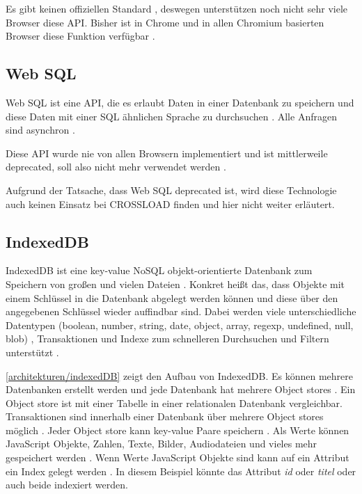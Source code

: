 Es gibt keinen offiziellen Standard \autocite{mdn-file-system} \autocite{caniuse-filesystem}, deswegen unterstützen noch nicht sehr viele Browser diese \ac{API}. Bisher ist in Chrome und in allen Chromium basierten Browser diese Funktion verfügbar \autocite{caniuse-filesystem}.

\subsection{Web SQL}
Web SQL ist eine \ac{API}, die es erlaubt Daten in einer Datenbank zu speichern und diese Daten mit einer SQL ähnlichen Sprache zu durchsuchen \autocite{w3-web-sql}. Alle Anfragen sind asynchron \autocite{Hajian2019}.

Diese \ac{API} wurde nie von allen Browsern implementiert und ist mittlerweile deprecated, soll also nicht mehr verwendet werden \autocite{Hajian2019}.

Aufgrund der Tatsache, dass Web SQL deprecated ist, wird diese Technologie auch keinen Einsatz bei CROSSLOAD finden und hier nicht weiter erläutert. 

\subsection{IndexedDB}
IndexedDB ist eine key-value NoSQL objekt-orientierte Datenbank zum Speichern von großen und vielen Dateien \autocite{Hajian2019}. Konkret heißt das, dass Objekte mit einem Schlüssel in die Datenbank abgelegt werden können und diese über den angegebenen Schlüssel wieder auffindbar sind. Dabei werden viele unterschiedliche Datentypen (boolean, number, string, date, object, array, regexp, undefined, null, \ac{blob}) \autocite{mdn-indexeddb}, Transaktionen und Indexe zum schnelleren Durchsuchen und Filtern unterstützt \autocite{Sheppard2017}. 

\autoref{architekturen/indexedDB} zeigt den Aufbau von IndexedDB. Es können mehrere Datenbanken erstellt werden und jede Datenbank hat mehrere Object stores \autocite{mdn-indexeddb}. Ein Object store ist mit einer Tabelle in einer relationalen Datenbank vergleichbar. Transaktionen sind innerhalb einer Datenbank über mehrere Object stores möglich \autocite{mdn-indexeddb}. Jeder Object store kann key-value Paare speichern \autocite{Sheppard2017}. Als Werte können JavaScript Objekte, Zahlen, Texte, Bilder, Audiodateien und vieles mehr gespeichert werden \autocite{mdn-indexeddb}. Wenn Werte JavaScript Objekte sind kann auf ein Attribut ein Index gelegt werden \autocite{mdn-indexeddb}. In diesem Beispiel könnte das Attribut \textit{id} oder \textit{titel} oder auch beide indexiert werden.

